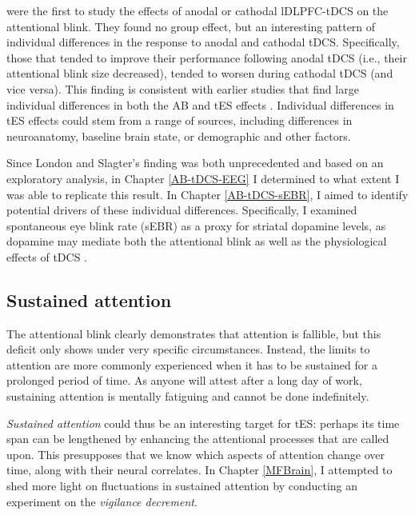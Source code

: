 \documentclass[11pt,]{memoir}
\begin{document}
\textcite{London2015} were the first to study the effects of anodal or cathodal lDLPFC-tDCS on the attentional blink. They found no group effect, but an interesting pattern of individual differences in the response to anodal and cathodal tDCS. Specifically, those that tended to improve their performance following anodal tDCS (i.e., their attentional blink size decreased), tended to worsen during cathodal tDCS (and vice versa). This finding is consistent with earlier studies that find large individual differences in both the AB \autocite{Willems2016} and tES effects \autocites{Krause2014}{Li2015b}. Individual differences in tES effects could stem from a range of sources, including differences in neuroanatomy, baseline brain state, or demographic and other factors.

Since London and Slagter's \autocite*{London2015} finding was both unprecedented and based on an exploratory analysis, in Chapter \ref{AB-tDCS-EEG} I determined to what extent I was able to replicate this result. In Chapter \ref{AB-tDCS-sEBR}, I aimed to identify potential drivers of these individual differences. Specifically, I examined spontaneous eye blink rate (sEBR) as a proxy for striatal dopamine levels, as dopamine may mediate both the attentional blink \autocite{Jongkees2016} as well as the physiological effects of tDCS \autocite{Stagg2018}.

\hypertarget{sustained-attention}{%
\subsection{Sustained attention}\label{sustained-attention}}

The attentional blink clearly demonstrates that attention is fallible, but this deficit only shows under very specific circumstances. Instead, the limits to attention are more commonly experienced when it has to be sustained for a prolonged period of time. As anyone will attest after a long day of work, sustaining attention is mentally fatiguing \autocites{Ackerman2011}{Hockey2013} and cannot be done indefinitely.

\emph{Sustained attention} could thus be an interesting target for tES: perhaps its time span can be lengthened by enhancing the attentional processes that are called upon. This presupposes that we know which aspects of attention change over time, along with their neural correlates. In Chapter \ref{MFBrain}, I attempted to shed more light on fluctuations in sustained attention by conducting an experiment on the \emph{vigilance decrement}.
\end{document}
